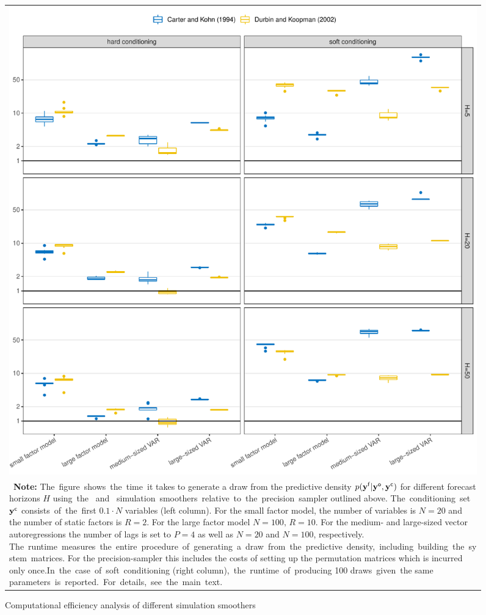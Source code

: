 \documentclass[notitlepage,a4paper,12pt]{article}
\begin{document}
\begin{figure}[htbp] \centering
    \caption{Computational efficiency analysis of different simulation smoothers \label{figsimulation}}
    \footnotesize
    \begin{tabular}{p{16cm}}
    \multicolumn{1}{c}{\includegraphics*[scale = 0.6]{../figures/fig_simulations_Ncond_10.pdf}} \\
    {
    \footnotesize \textbf{Note:} The figure shows the time it takes to generate a draw from the predictive density $p(\mathbf{y^{\sf{f}}}|\mathbf{y^{\sf{o}}}, \mathbf{y^{\sf{c}}})$ for different forecast horizons $H$ using the \citet{carterkohn1994_biomtr} and \citet{durbinkoopman2002_biomtr} simulation smoothers relative to the precision sampler outlined above. The conditioning set $\mathbf{y}^{\sf{c}}$ consists of the first $0.1\cdot N$ variables (left column). For the small factor model, the number of variables is $N=20$ and the number of static factors is $R=2$. For the large factor model $N=100,\, R = 10$. For the medium- and large-sized vector autoregressions the number of lags is set to $P=4$ as well as $N=20$ and $N=100$, respectively. The runtime measures the entire procedure of generating a draw from the predictive density, including building the system matrices. For the precision-sampler this includes the costs of setting up the permutation matrices which is incurred only once.In the case of soft conditioning (right column), the runtime of producing 100 draws given the same parameters is reported. For details, see the main text.
    }
    \end{tabular}
    \newline
    \normalsize
\end{figure}
\end{document}
